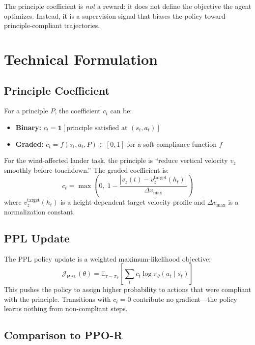 \documentclass[10pt,twocolumn]{article}
\begin{document}
The principle coefficient is \emph{not} a reward: it does not define the objective the agent optimizes.
Instead, it is a supervision signal that biases the policy toward principle-compliant trajectories.

\section{Technical Formulation}

\subsection*{Principle Coefficient}

For a principle $P$, the coefficient $c_t$ can be:
\begin{itemize}[leftmargin=1em,itemsep=1pt]
  \item \textbf{Binary:} $c_t = \mathbf{1}[\text{principle satisfied at } (s_t, a_t)]$
  \item \textbf{Graded:} $c_t = f(s_t, a_t, P) \in [0,1]$ for a soft compliance function $f$
\end{itemize}

For the wind-affected lander task, the principle is ``reduce vertical velocity $v_z$ smoothly before touchdown.''
The graded coefficient is:
\begin{equation}
c_t = \max\!\left(0,\; 1 - \frac{|v_z(t) - v_z^{\text{target}}(h_t)|}{\Delta v_{\max}}\right)
\label{eq:coeff}
\end{equation}
where $v_z^{\text{target}}(h_t)$ is a height-dependent target velocity profile and $\Delta v_{\max}$ is a normalization constant.

\subsection*{PPL Update}

The PPL policy update is a weighted maximum-likelihood objective:
\begin{equation}
\mathcal{J}_{\text{PPL}}(\theta) = \mathbb{E}_{\tau \sim \pi_\theta}\!\left[\sum_t c_t \log \pi_\theta(a_t \mid s_t)\right]
\label{eq:ppl}
\end{equation}
This pushes the policy to assign higher probability to actions that were compliant with the principle.
Transitions with $c_t = 0$ contribute no gradient---the policy learns nothing from non-compliant steps.

\subsection*{Comparison to PPO-R}
\end{document}
